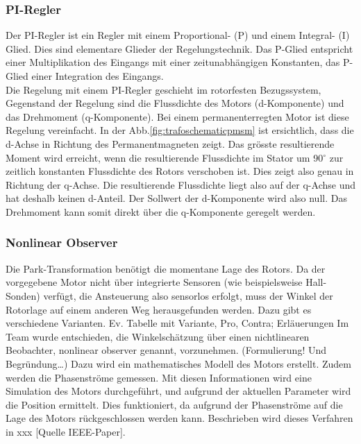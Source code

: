 \subsubsection{PI-Regler}
Der PI-Regler ist ein Regler mit einem Proportional- (P) und einem Integral- (I) Glied. Dies sind elementare Glieder der Regelungstechnik. Das P-Glied entspricht einer Multiplikation des Eingangs mit einer zeitunabhängigen Konstanten, das P-Glied einer Integration des Eingangs. 
\\
Die Regelung mit einem PI-Regler geschieht im rotorfesten Bezugssystem, Gegenstand der Regelung sind die Flussdichte des Motors (d-Komponente) und das Drehmoment (q-Komponente). Bei einem permanenterregten Motor ist diese Regelung vereinfacht. In der Abb.\ref{fig:trafoschematicpmsm} ist ersichtlich, dass die d-Achse in Richtung des Permanentmagneten zeigt. Das grösste resultierende Moment wird erreicht, wenn die resultierende Flussdichte im Stator um 90\(^\circ\) zur zeitlich konstanten Flussdichte des Rotors verschoben ist. Dies zeigt also genau in Richtung der q-Achse. Die resultierende Flussdichte liegt also auf der q-Achse und hat deshalb keinen d-Anteil. Der Sollwert der d-Komponente wird also null. Das Drehmoment kann somit direkt über die q-Komponente geregelt werden. 





\subsubsection{Nonlinear Observer}
Die Park-Transformation benötigt die momentane Lage des Rotors. Da der vorgegebene Motor nicht über integrierte Sensoren (wie beispielsweise Hall-Sonden) verfügt, die Ansteuerung also sensorlos erfolgt, muss der Winkel der Rotorlage auf einem anderen Weg herausgefunden werden. Dazu gibt es verschiedene Varianten. 
Ev. Tabelle mit Variante, Pro, Contra; Erläuerungen 
Im Team wurde entschieden, die Winkelschätzung über einen nichtlinearen Beobachter, nonlinear observer genannt, vorzunehmen. (Formulierung! Und Begründung…) Dazu wird ein mathematisches Modell des Motors erstellt. Zudem werden die Phasenströme gemessen. Mit diesen Informationen wird eine Simulation des Motors durchgeführt, und aufgrund der aktuellen Parameter wird die Position ermittelt. Dies funktioniert, da aufgrund der Phasenströme auf die Lage des Motors rückgeschlossen werden kann. Beschrieben wird dieses Verfahren in xxx [Quelle IEEE-Paper].

